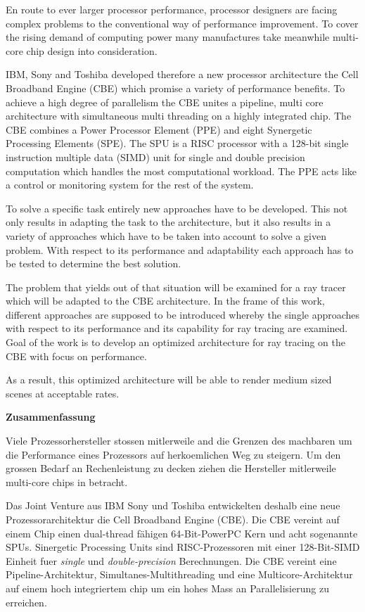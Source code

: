 \documentclass[DIV10, abstracton, openright, footsepline, headsepline, twoside, 9pt,
bigheadings]{scrreprt}
\begin{document}
\abstract
En route to ever larger processor performance, processor designers are
facing complex problems to the conventional way of performance improvement. To
cover the rising demand of computing power many manufactures take meanwhile
multi-core chip design into consideration.

IBM, Sony and Toshiba developed therefore a new processor architecture the Cell
Broadband Engine (CBE) which promise a variety of performance bene\-fits. To
achieve a high degree of parallelism the CBE unites a pipeline, multi core
architecture with simultaneous multi threading on a highly integrated chip.
The CBE combines a Power Processor Element (PPE) and eight Synergetic
Processing Elements (SPE). The SPU is a RISC processor with a 128-bit single
instruction multiple data (SIMD) unit for single and double precision
computation which handles the most computational workload. The PPE acts like
a control or monitoring system for the rest of the system.

To solve a specific task entirely new approaches have to be developed. This not
only results in adapting the task to the architecture, but it also results in a
variety of approaches which have to be taken into account to solve a given
problem. With respect to its performance and adaptability each approach has to
be tested to determine the best solution.

The problem that yields out of that situation will be examined for a ray tracer
which will be adapted to the CBE architecture. In the frame of this work,
different approaches are supposed to be introduced whereby the single approaches
with respect to its performance and its capability for ray tracing are examined.
Goal of the work is to develop an optimized architecture for ray tracing on the
CBE with focus on performance.

As a result, this optimized architecture will be able to render medium sized
scenes at acceptable rates.

\begin{center}
\textbf{\textcolor{Bigblue}{\textsf{Zusammenfassung}}}
\end{center}
Viele Prozessorhersteller stossen mitlerweile and die Grenzen des machbaren um
die Performance eines Prozessors auf herkoemlichen Weg zu steigern. Um den grossen
Bedarf an Rechenleistung zu decken ziehen die Hersteller mitlerweile multi-core chips in betracht.

Das Joint Venture aus IBM Sony und Toshiba entwickelten deshalb eine neue Prozessorarchitektur die Cell Broadband Engine (CBE).
Die CBE vereint auf einem Chip einen dual-thread f\"ahigen 64-Bit-PowerPC Kern und acht sogenannte SPUs. Sinergetic Processing Units sind RISC-Prozessoren mit einer 128-Bit-SIMD Einheit fuer \textit{single} und \textit{double-precision} Berechnungen.
Die CBE vereint eine Pipeline-Architektur, Simultanes-Multithreading und eine Multicore-Architektur auf einem hoch integriertem chip um ein hohes Mass an Parallelisierung zu erreichen.
\end{document}
